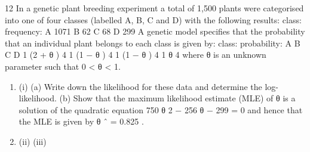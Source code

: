 \documentclass[a4paper,12pt]{article}
\begin{document}
\begin{enumerate}

12
In a genetic plant breeding experiment a total of 1,500 plants were categorised into one of four classes (labelled A, B, C and D) with the following results:
class:
frequency:
A
1071
B
62
C
68
D
299
A genetic model specifies that the probability that an individual plant belongs to each
class is given by:
class:
probability:
A B C D
1
(2 + θ )
4 1
(1 − θ )
4 1
(1 − θ )
4 1
θ
4
where θ is an unknown parameter such that 0 < θ < 1.
\begin{enumerate}
\item (i)
(a) Write down the likelihood for these data and determine the log-likelihood.
(b) Show that the maximum likelihood estimate (MLE) of θ is a solution of the quadratic equation
750 θ 2 − 256 θ − 299 = 0
and hence that the MLE is given by θ ˆ = 0.825 .
\item (ii)
(iii)


\end{enumerate}
\end{enumerate}
\end{document}
